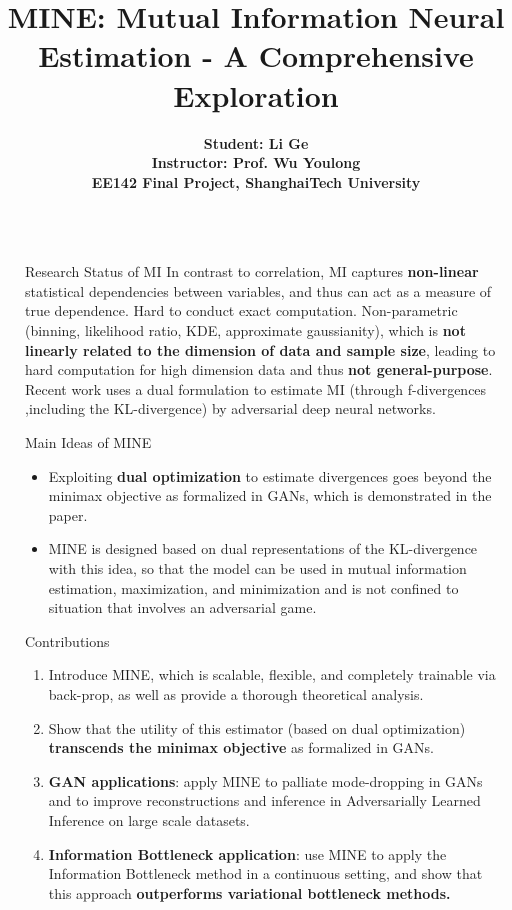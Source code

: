 \documentclass[final]{beamer}
\title{MINE: Mutual Information Neural Estimation - A Comprehensive Exploration}
\author{
        \textbf{Student: Li Ge}\\
        \textbf{Instructor: Prof. Wu Youlong}\\
        \textbf{EE142 Final Project, ShanghaiTech University}\\
}
\newlength{\sepwidth}
\newlength{\colwidth}
\newcommand{\separatorcolumn}{\begin{column}{\sepwidth}\end{column}}
\begin{document}
\begin{frame}[t]
\begin{columns}[t]
\separatorcolumn

\begin{column}{\colwidth}

\begin{block}{Research Status of MI}
        In contrast to correlation, MI captures \textbf{non-linear} statistical dependencies between variables, and thus can act as a measure of true dependence. 
        Hard to conduct exact computation.
        Non-parametric (binning, likelihood ratio, KDE, approximate gaussianity), which is \textbf{not linearly related to the dimension of data and sample size}, leading to hard computation for high dimension data and thus \textbf{not general-purpose}. Recent work uses a dual formulation to estimate MI (through f-divergences ,including the KL-divergence) by adversarial deep neural networks. 

\end{block}

\begin{block}{Main Ideas of MINE}

    \begin{itemize}
      \item Exploiting \textbf{dual optimization} to estimate divergences goes beyond the minimax objective as formalized in GANs, which is demonstrated in the paper.
      \item MINE is designed based on dual representations of the KL-divergence with this idea, so that the model can be used in mutual information estimation, maximization, and minimization and is not confined to situation that involves an adversarial game.

    \end{itemize}

\end{block}

\begin{block}{Contributions}

    \begin{enumerate}
      \item Introduce MINE, which is scalable, flexible, and completely trainable via back-prop, as well as provide a thorough theoretical analysis.
      \item Show that the utility of this estimator (based on dual optimization) \textbf{transcends the minimax objective} as formalized in GANs.
      \item \textbf{GAN applications}: apply MINE to palliate mode-dropping in GANs and to improve reconstructions and inference in Adversarially Learned Inference on large scale datasets.
      \item \textbf{Information Bottleneck application}: use MINE to apply the Information Bottleneck method in a continuous setting, and show that this approach \textbf{outperforms variational bottleneck methods.}


\end{enumerate}
\end{block}
\end{column}
\end{columns}
\end{frame}
\end{document}
